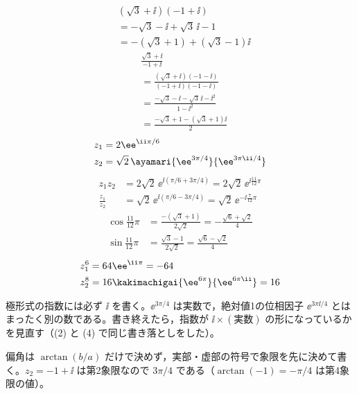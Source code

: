 \begin{align*}
&(\sqrt{3}+\ii)(-1+\ii)\\
&=-\sqrt{3}-\ii+\sqrt{3}\,\ii-1\\
&=-(\sqrt{3}+1)+(\sqrt{3}-1)\ii
\end{align*}
\begin{align*}
&\frac{\sqrt{3}+\ii}{-1+\ii}\\
&=\frac{(\sqrt{3}+\ii)(-1-\ii)}{(-1+\ii)(-1-\ii)}\\
&=\frac{-\sqrt{3}-\ii-\sqrt{3}\,\ii-\ii^{2}}{1-\ii^{2}}\\
&=\frac{-\sqrt{3}+1-(\sqrt{3}+1)\ii}{2}
\end{align*}
\begin{align*}
z_{1}&=2\ee^{\ii\pi/6}\\
z_{2}&=\sqrt{2}\,\ayamari{\ee^{3\pi/4}}{\ee^{3\pi\ii/4}}
\end{align*}
\begin{align*}
z_{1}z_{2}&=2\sqrt{2}\,\ee^{\ii(\pi/6+3\pi/4)}=2\sqrt{2}\,\ee^{\ii\frac{11}{12}\pi}\\
\frac{z_{1}}{z_{2}}&=\sqrt{2}\,\ee^{\ii(\pi/6-3\pi/4)}=\sqrt{2}\,\ee^{-\ii\frac{7}{12}\pi}
\end{align*}
\begin{align*}
\cos\frac{11}{12}\pi&=\frac{-(\sqrt{3}+1)}{2\sqrt{2}}=-\frac{\sqrt{6}+\sqrt{2}}{4}\\
\sin\frac{11}{12}\pi&=\frac{\sqrt{3}-1}{2\sqrt{2}}=\frac{\sqrt{6}-\sqrt{2}}{4}
\end{align*}
\begin{align*}
z_{1}^{6}&=64\ee^{\ii\pi}=-64\\
z_{2}^{8}&=16\kakimachigai{\ee^{6\pi}}{\ee^{6\pi\ii}}=16
\end{align*}
\item 極形式の指数には必ず $\ii$ を書く。$\ee^{3\pi/4}$ は実数で，絶対値1の位相因子 $\ee^{3\pi\ii/4}$ とはまったく別の数である。書き終えたら，指数が $\ii\times(\text{実数})$ の形になっているかを見直す（(2) と (4) で同じ書き落としをした）。
\item 偏角は $\arctan(b/a)$ だけで決めず，実部・虚部の符号で象限を先に決めて書く。$z_{2}=-1+\ii$ は第2象限なので $3\pi/4$ である（$\arctan(-1)=-\pi/4$ は第4象限の値）。
